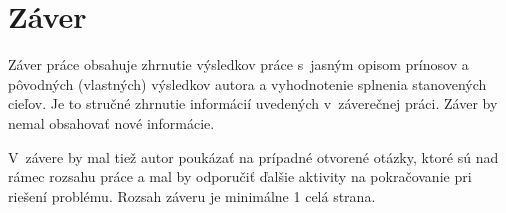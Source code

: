 
\chapter{Záver}
\label{summary}

Záver práce obsahuje zhrnutie výsledkov práce s~jasným opisom prínosov a pôvodných (vlastných) výsledkov autora a vyhodnotenie splnenia stanovených cieľov. Je to stručné zhrnutie informácií uvedených v~záverečnej práci. Záver by nemal obsahovať nové informácie.

V~závere by mal tiež autor poukázať na prípadné otvorené otázky, ktoré sú nad rámec rozsahu práce a mal by odporučiť ďalšie aktivity na pokračovanie pri riešení problému. Rozsah záveru je minimálne 1 celá strana.
